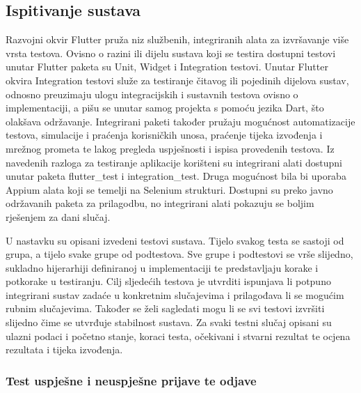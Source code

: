 			
			\subsection{Ispitivanje sustava}
			
			 {Razvojni okvir Flutter pruža niz službenih, integriranih alata za izvršavanje više vrsta testova. Ovisno o razini ili dijelu sustava koji se testira dostupni testovi unutar Flutter paketa su Unit, Widget i Integration testovi. Unutar Flutter okvira Integration testovi služe za testiranje čitavog ili pojedinih dijelova sustav, odnosno preuzimaju ulogu integracijskih i sustavnih testova ovisno o implementaciji, a pišu se unutar samog projekta s pomoću jezika Dart, što olakšava održavanje. Integrirani paketi također pružaju mogućnost automatizacije testova, simulacije i praćenja korisničkih unosa, praćenje tijeka izvođenja i mrežnog prometa te lakog pregleda uspješnosti i ispisa provedenih testova. Iz navedenih razloga za testiranje aplikacije korišteni su integrirani alati dostupni unutar paketa flutter\_test i integration\_test. Druga mogućnost bila bi uporaba Appium alata koji se temelji na Selenium strukturi. Dostupni su preko javno održavanih paketa za prilagodbu, no integrirani alati pokazuju se boljim rješenjem za dani slučaj.}
			 
			 {U nastavku su opisani izvedeni testovi sustava. Tijelo svakog testa se sastoji od grupa, a tijelo svake grupe od podtestova. Sve grupe i podtestovi se vrše slijedno, sukladno hijerarhiji definiranoj u implementaciji te predstavljaju korake i potkorake u testiranju. Cilj sljedećih testova je utvrditi ispunjava li potpuno integrirani sustav zadaće u konkretnim slučajevima i prilagođava li se mogućim rubnim slučajevima. Također se želi sagledati mogu li se svi testovi izvršiti slijedno čime se utvrđuje stabilnost sustava. Za svaki testni slučaj opisani su ulazni podaci i početno stanje, koraci testa, očekivani i stvarni rezultat te ocjena rezultata i tijeka izvođenja.}
			 
			 \subsubsection{Test uspješne i neuspješne prijave te odjave}
			 
